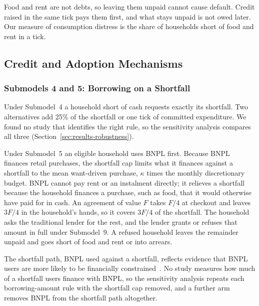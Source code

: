 Food and rent are not debts, so leaving them unpaid cannot cause default. Credit raised in the same
tick pays them first, and what stays unpaid is not owed later. Our measure of consumption distress
is the share of households short of food and rent in a tick.

\subsection{Credit and Adoption Mechanisms}
\label{sec:submodels}


\subsubsection*{Submodels 4 and 5: Borrowing on a Shortfall}
\label{sec:amount}

Under Submodel~4 a household short of cash requests exactly its shortfall. Two
alternatives add 25\% of the shortfall or one tick of committed expenditure. We found no study that
identifies the right rule, so the sensitivity analysis compares all three
(Section~\ref{sec:results-robustness}).

Under Submodel~5 an eligible household uses \ac{BNPL} first. Because \ac{BNPL} finances retail
purchases, the shortfall cap limits what it finances against a shortfall to the mean want-driven
purchase, $\kappa$ times the monthly discretionary budget. \ac{BNPL} cannot pay rent or an instalment directly; it
relieves a shortfall because the household finances a purchase, such as food, that it would
otherwise have paid for in cash. An agreement of value $F$ takes $F/4$ at checkout and leaves $3F/4$ in
the household's hands, so it covers $3F/4$ of the shortfall. The household asks the
traditional lender for the rest, and the lender grants or refuses that
amount in full under Submodel~9. A refused household leaves the remainder unpaid and goes
short of food and rent or into arrears.

The shortfall path, \ac{BNPL} used against a shortfall, reflects evidence that \ac{BNPL} users
are more likely to be financially constrained~\citep{hayashi2025constraints}. No study measures how much of a shortfall users finance with \ac{BNPL}, so the
sensitivity analysis repeats each borrowing-amount rule with the shortfall cap removed, and a further
arm removes \ac{BNPL} from the shortfall path altogether.

